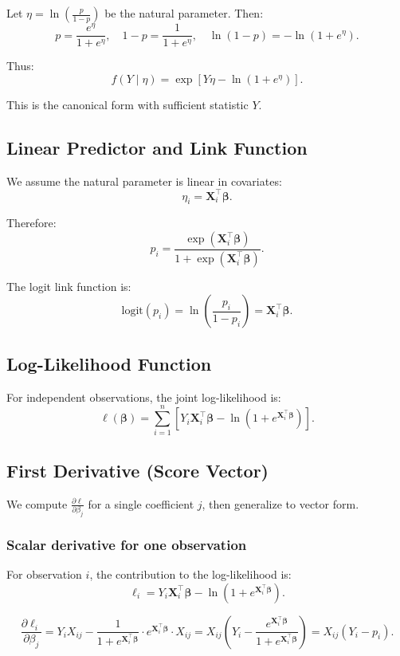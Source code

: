 \documentclass[12pt]{article}
\numberwithin{equation}{section}
\begin{document}
	Let $\eta = \ln\left(\frac{p}{1-p}\right)$ be the natural parameter. Then:
	\[
	p = \frac{e^\eta}{1+e^\eta}, \quad 1-p = \frac{1}{1+e^\eta}, \quad \ln(1-p) = -\ln(1+e^\eta).
	\]
	
	Thus:
	\[
	f(Y \mid \eta) = \exp\left[ Y\eta - \ln(1+e^\eta) \right].
	\]
	
	This is the canonical form with sufficient statistic $Y$.
	
	\subsection{Linear Predictor and Link Function}
	
	We assume the natural parameter is linear in covariates:
	\[
	\eta_i = \mathbf{X}_i^\top \boldsymbol{\beta}.
	\]
	
	Therefore:
	\[
	p_i = \frac{\exp(\mathbf{X}_i^\top \boldsymbol{\beta})}{1 + \exp(\mathbf{X}_i^\top \boldsymbol{\beta})}.
	\]
	
	The logit link function is:
	\[
	\text{logit}(p_i) = \ln\left(\frac{p_i}{1-p_i}\right) = \mathbf{X}_i^\top \boldsymbol{\beta}.
	\]
	
	\subsection{Log-Likelihood Function}
	
	For independent observations, the joint log-likelihood is:
	\[
	\ell(\boldsymbol{\beta}) = \sum_{i=1}^n \left[ Y_i \mathbf{X}_i^\top \boldsymbol{\beta} - \ln\left(1 + e^{\mathbf{X}_i^\top \boldsymbol{\beta}}\right) \right].
	\]
	
	\subsection{First Derivative (Score Vector)}
	
	We compute $\frac{\partial \ell}{\partial \beta_j}$ for a single coefficient $j$, then generalize to vector form.
	
	\subsubsection{Scalar derivative for one observation}
	For observation $i$, the contribution to the log-likelihood is:
	\[
	\ell_i = Y_i \mathbf{X}_i^\top \boldsymbol{\beta} - \ln(1 + e^{\mathbf{X}_i^\top \boldsymbol{\beta}}).
	\]
	
	\[
	\frac{\partial \ell_i}{\partial \beta_j} = Y_i X_{ij} - \frac{1}{1+e^{\mathbf{X}_i^\top \boldsymbol{\beta}}} \cdot e^{\mathbf{X}_i^\top \boldsymbol{\beta}} \cdot X_{ij} = X_{ij} \left( Y_i - \frac{e^{\mathbf{X}_i^\top \boldsymbol{\beta}}}{1+e^{\mathbf{X}_i^\top \boldsymbol{\beta}}} \right) = X_{ij} (Y_i - p_i).
	\]
	
\end{document}
